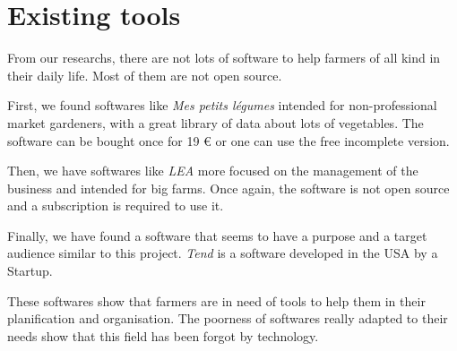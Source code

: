\section{Existing tools}

From our researchs, there are not lots of software to help farmers of all kind in their daily life. Most of them are not open source.

First, we found softwares like \emph{Mes petits légumes}\cite{mespetitslegumes} intended for non-professional market gardeners, with a great library of data about lots of vegetables. The software can be bought once for 19 \euro{} or one can use the free incomplete version.



Then, we have softwares like \emph{LEA}\cite{lea-agri} more focused on the management of the business and intended for big farms. Once again, the software is not open source and a subscription is required to use it.

Finally, we have found a software that seems to have a purpose and a target audience similar to this project. \emph{Tend}\cite{tend} is a software developed in the USA by a Startup.

These softwares show that farmers are in need of tools to help them in their planification and organisation. The poorness of softwares really adapted to their needs show that this field has been forgot by technology.


